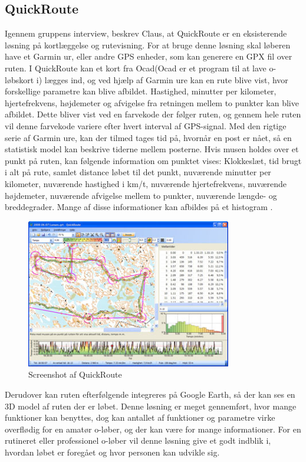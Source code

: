 \subsection{QuickRoute}
Igennem gruppens interview, beskrev Claus, at QuickRoute er en eksisterende løsning på kortlæggelse og rutevisning. For at bruge denne løsning skal løberen have et Garmin ur, eller andre GPS enheder, som kan generere en GPX fil over ruten. I QuickRoute kan et kort fra Ocad(Ocad er et program til at lave o-løbskort i) lægges ind, og ved hjælp af Garmin ure kan en rute blive vist, hvor forskellige parametre kan blive afbildet. Hastighed, minutter per kilometer, hjertefrekvens, højdemeter og afvigelse fra retningen mellem to punkter kan blive afbildet. Dette bliver vist ved en farvekode der følger ruten, og gennem hele ruten vil denne farvekode variere efter hvert interval af GPS-signal. Med den rigtige serie af Garmin ure, kan der tilmed tages tid på, hvornår en post er nået, så en statistisk model kan beskrive tiderne mellem posterne. Hvis musen holdes over et punkt på ruten, kan følgende information om punktet vises: Klokkeslæt, tid brugt i alt på rute, samlet distance løbet til det punkt, nuværende minutter per kilometer, nuværende hastighed i km/t, nuværende hjertefrekvens, nuværende højdemeter, nuværende afvigelse mellem to punkter, nuværende længde- og breddegrader. Mange af disse informationer kan afbildes på et histogram \citep{QR}.

\begin{figure}[h]
	\centering
	\includegraphics[width=0.8\textwidth]{billeder/QR}
	\caption{Screenshot af QuickRoute}
\end{figure}

Derudover kan ruten efterfølgende integreres på Google Earth, så der kan ses en 3D model af ruten der er løbet. 
Denne løsning er meget gennemført, hvor mange funktioner kan benyttes, dog kan antallet af funktioner og parametre virke overflødig for en amatør o-løber, og der kan være for mange informationer. For en rutineret eller professionel o-løber vil denne løsning give et godt indblik i, hvordan løbet er foregået og hvor personen kan udvikle sig.


